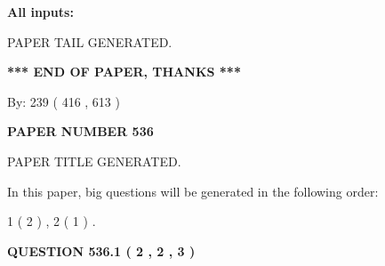 \documentclass[12pt]{article}
\begin{document}
   
   
   
\noindent{}
   
   
   
   
\noindent\vspace{0.1in}\hspace{-0.08in} {\textbf{\Large{All inputs: }}}
   
   
   
   
   
   
 \vspace{0.2in}
 
   
   
\vspace{2.0in} PAPER TAIL GENERATED.
   
   
   
   
\vspace{1.0in} 
{\textbf{\large{ *** END OF PAPER, THANKS *** }}} 
   
   
\hspace{1.0in} By: 
 239 ( 416 ,  613 )
   
   
   
   
\newpage 
\setcounter{page}{ 
   536001 } 
   
   
   
   
 {\textbf{ \Large{ PAPER NUMBER  536  }}}
   
   
\vspace{0.2in}
   
   
   
   
   
   
   
   
 \vspace{0.2in}
 
 
 
 
   
   
 PAPER TITLE GENERATED.
   
   
   
\vspace{0.2in}
   
In this paper, big questions will be generated in the following order: 
   
   
   1 ( 2 )
 ,
   2 ( 1 )
 .
  
\vspace{0.2in}
  
{\textbf{\Large{QUESTION
536.1 
 ( 2 , 2 , 3 )
}}}
  
\end{document}
